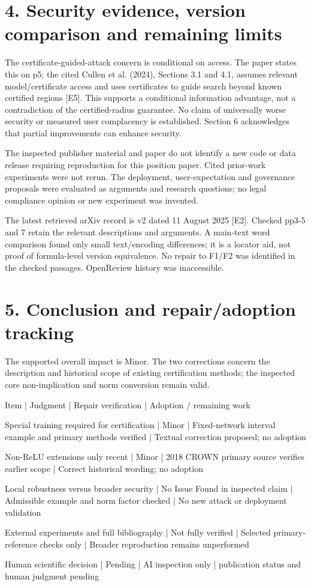 \documentclass[10pt]{article}
\begin{document}
\section*{4. Security evidence, version comparison and remaining limits}
The certificate-guided-attack concern is conditional on access. The paper states this on p5; the cited Cullen et al. (2024), Sections 3.1 and 4.1, assumes relevant model/certificate access and uses certificates to guide search beyond known certified regions [E5]. This supports a conditional information advantage, not a contradiction of the certified-radius guarantee. No claim of universally worse security or measured user complacency is established. Section 6 acknowledges that partial improvements can enhance security.\par
The inspected publisher material and paper do not identify a new code or data release requiring reproduction for this position paper. Cited prior-work experiments were not rerun. The deployment, user-expectation and governance proposals were evaluated as arguments and research questions; no legal compliance opinion or new experiment was invented.\par
The latest retrieved arXiv record is v2 dated 11 August 2025 [E2]. Checked pp3-5 and 7 retain the relevant descriptions and arguments. A main-text word comparison found only small text/encoding differences; it is a locator aid, not proof of formula-level version equivalence. No repair to F1/F2 was identified in the checked passages. OpenReview history was inaccessible.\par
\section*{5. Conclusion and repair/adoption tracking}
The supported overall impact is Minor. The two corrections concern the description and historical scope of existing certification methods; the inspected core non-implication and norm conversion remain valid.\par
Item | Judgment | Repair verification | Adoption / remaining work\par
Special training required for certification | Minor | Fixed-network interval example and primary methods verified | Textual correction proposed; no adoption\par
Non-ReLU extensions only recent | Minor | 2018 CROWN primary source verifies earlier scope | Correct historical wording; no adoption\par
Local robustness versus broader security | No Issue Found in inspected claim | Admissible example and norm factor checked | No new attack or deployment validation\par
External experiments and full bibliography | Not fully verified | Selected primary-reference checks only | Broader reproduction remains unperformed\par
Human scientific decision | Pending | AI inspection only | publication status and human judgment pending\par
\end{document}
